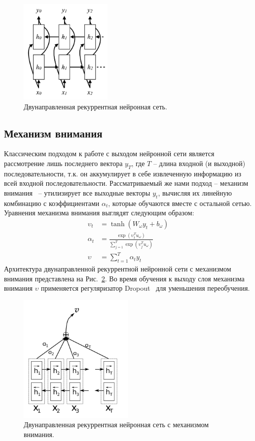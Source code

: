 \documentclass[12pt]{article}
\newcommand{\ENGLISH}[1]{#1}
\begin{document}
\begin{figure}[h]
  \centering
  \includegraphics[width=0.4\textwidth]{images/birnn2_bin.png}
  \caption{Двунаправленная рекуррентная нейронная сеть.}
  \label{fig:birnn}
\end{figure}

\subsection{Механизм внимания}
Классическим подходом к работе с выходом нейронной сети является рассмотрение лишь последнего вектора $y_{T}$, где $T$ -- длина входной (и выходной) последовательности, т.к. он аккумулирует в себе извлеченную информацию из всей входной последовательности. Рассматриваемый же нами подход -- механизм внимания~\cite{bahdanau} -- утилизирует все выходные векторы $y_{t}$, вычисляя их линейную комбинацию с коэффициентами $\alpha_{t}$, которые обучаются вместе с остальной сетью. Уравнения механизма внимания выглядят следующим образом:
	\begin{align}	
    \upsilon_{t}&=\tanh{(W_{\omega}y_{t}+b_{\omega})}\\
	\alpha_{t}&=\frac{\exp{(\upsilon_{t}^{T}u_{\omega})}}{\sum_{j=1}^{T}\exp{(\upsilon_{j}^{T}u_{\omega})}}\\
	\upsilon&=\sum_{t=1}^{T}\alpha_{t}y_{t}
	\end{align}	
Архитектура двунаправленной рекуррентной нейронной сети с механизмом внимания представлена на Рис.~\ref{fig:att}. Во время обучения к выходу слоя механизма внимания $\upsilon$ применяется регуляризатор \ENGLISH{Dropout}~\cite{srivastava} для уменьшения переобучения.

\begin{figure}[h]
  \centering
  \includegraphics[width=0.5\textwidth]{images/att_edited.png}
  \caption{Двунаправленная рекуррентная нейронная сеть с механизмом внимания.}
  \label{fig:att}
\end{figure}
\end{document}
